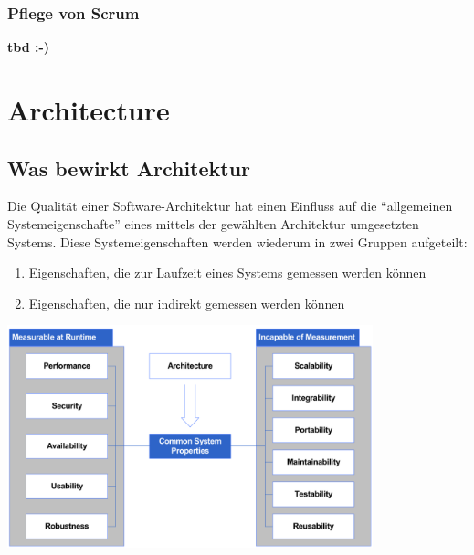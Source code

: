 \documentclass{report}
\newenvironment{Figure}
	{\par\medskip\noindent\minipage{\linewidth}}
	{\endminipage\par\medskip}
\theoremstyle{definition}
\theoremstyle{example}
\begin{document}
\subsection{Pflege von Scrum}
\textbf{tbd :-)}

\chapter{Architecture}

\section{Was bewirkt Architektur}
Die Qualität einer Software-Architektur hat einen Einfluss auf die ``allgemeinen Systemeigenschafte'' eines mittels der gewählten Architektur umgesetzten Systems. Diese Systemeigenschaften werden wiederum in zwei Gruppen aufgeteilt:\\
\begin{enumerate}
	\item Eigenschaften, die zur Laufzeit eines Systems gemessen werden können
	\item Eigenschaften, die nur indirekt gemessen werden können
\end{enumerate}

\begin{Figure}
\centering
\includegraphics[width=400px]{img/WirkungArchitektur.png}
	\label{fig:Was bewirkt Architektur}
\end{Figure}
\end{document}
